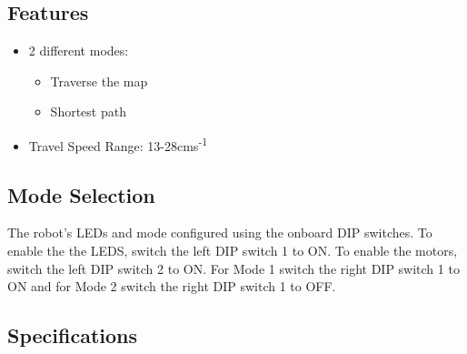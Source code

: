 \begin{multicols}{2}
\subsection*{Features}
\begin{itemize}
    \item 2 different modes:
    \begin{itemize}
        \item Traverse the map
        \item Shortest path
    \end{itemize}
    \item Travel Speed Range: 13-28cms\textsuperscript{-1}
\end{itemize}

\subsection*{Mode Selection}
The robot’s LEDs and mode configured using the onboard DIP switches. To enable the the LEDS, switch the left DIP switch 1 to ON. To enable the motors, switch the left DIP switch 2 to ON. For Mode 1 switch the right DIP switch 1 to ON and for Mode 2 switch the right DIP switch 1 to OFF.


\end{multicols}

\subsection*{Specifications}
\vspace{-4mm}
\begin{table}[h!]
\centering
\small
{}
\end{table}


